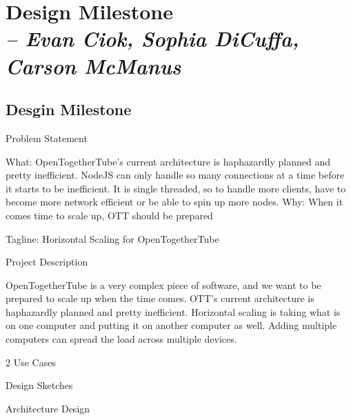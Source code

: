 \chapter{Design Milestone \\
  \small{\textit{-- Evan Ciok, Sophia DiCuffa, Carson McManus}}
  \label{Chapter::designMilestone}}

\section{Desgin Milestone \label{Section::designMilestone}}

Problem Statement

What: OpenTogetherTube’s current architecture is haphazardly planned and pretty inefficient. NodeJS can only handle so many connections at a time before it starts to be inefficient. 
It is single threaded, so to handle more clients, have to become more network efficient or be able to spin up more nodes.
Why:  When it comes time to scale up, OTT should be prepared 

Tagline: Horizontal Scaling for OpenTogetherTube

Project Description

OpenTogetherTube is a very complex piece of software, and we want to be prepared to scale up when the time comes. OTT's current architecture is haphazardly planned and pretty inefficient. 
Horizontal scaling is taking what is on one computer and putting it on another computer as well. Adding multiple computers can spread the load across multiple devices.


2 Use Cases


Design Sketches


Architecture Design
